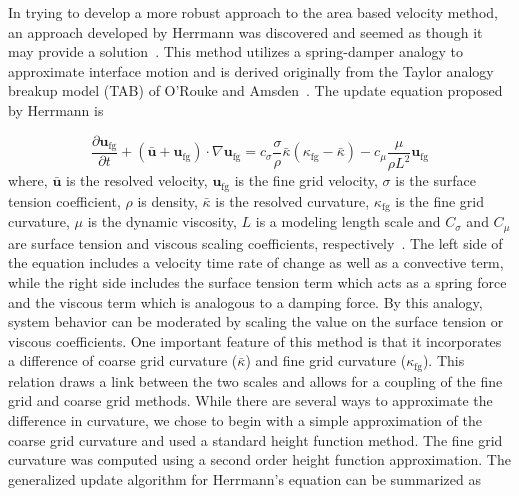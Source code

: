 In trying to develop a more robust approach to the area based velocity method, an approach developed by Herrmann was discovered and seemed as though it may provide a  solution~\cite{Herrmann2013}. This method utilizes a spring-damper analogy to approximate interface motion and is derived  originally from the Taylor analogy breakup model (TAB) of O'Rouke and Amsden~\cite{TAB}. The update equation proposed by Herrmann  is 

\begin{equation}
\frac{\partial \bm{u}_{\text{fg}}}{\partial t} +
(\bar{\bm{u}}+\bm{u}_{\text{fg}}) \cdot \nabla \bm{u}_{\text{fg}} =
c_{\sigma}\frac{\sigma}{\rho}\bar{\kappa}(\kappa_{\text{fg}}-\bar{\kappa})- 
c_{\mu}\frac{\mu}{\rho L^2}\bm{u}_{\text{fg}}
\label{eqn:HermEq}
\end{equation}
where, $\bar{\bm{u}}$ is the resolved velocity,
$\bm{u}_{\text{fg}}$ is the fine grid velocity,
$\sigma$ is the surface tension coefficient,
$\rho$ is density, 
$\bar{\kappa}$ is the resolved curvature,
$\kappa_{\text{fg}}$ is the fine grid curvature,
$\mu$ is the dynamic viscosity,
$L$ is a modeling length scale and
$C_\sigma$ and
$C_\mu$ are surface tension and viscous scaling coefficients, respectively~\cite{Herrmann2013}. 
The left side of the equation includes a velocity time rate of change as well as a convective term, while the right side includes the surface tension term which acts as a spring force and the viscous term which is analogous to a damping force. By this analogy, system behavior can be moderated by scaling the value on the surface tension or viscous coefficients. One important feature of this method is that it incorporates a difference of coarse grid curvature ($\bar{\kappa}$) and fine grid curvature ($\kappa_{\text{fg}}$). This relation draws a link between the two scales and allows for a coupling of the fine grid and coarse grid methods. While there are several ways to approximate the difference in curvature, we chose to begin with a simple approximation of the coarse grid curvature and used a standard height function method. The fine grid curvature was computed using a second order height function approximation. The generalized update algorithm for Herrmann's equation can be summarized as 
